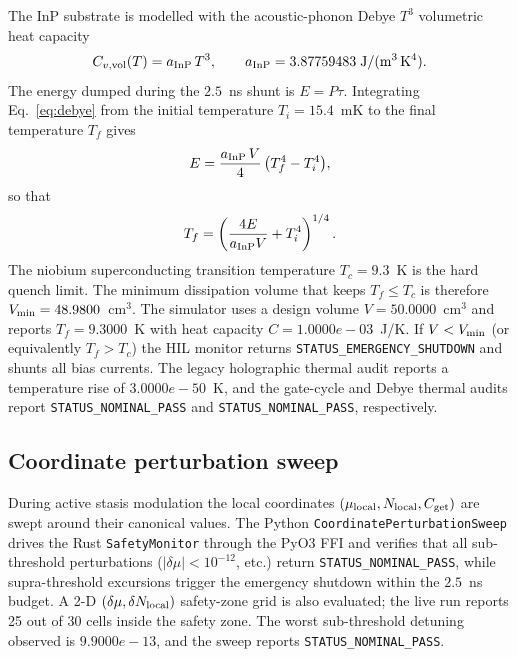 \documentclass[aps,pra,10pt,onecolumn,superscriptaddress,nofootinbib,longbibliography,floatfix]{revtex4-2}
\newcommand{\ExoticShuntStatus}{\texttt{STATUS\_NOMINAL\_PASS}}%
\newcommand{\ExoticThermalStatus}{\texttt{STATUS\_NOMINAL\_PASS}}%
\newcommand{\ExoticTemperatureRiseK}{3.0000e-50}%
\newcommand{\ExoticDebyeFinalTempK}{9.3000}%
\newcommand{\ExoticDissipationVolume}{50.0000}%
\newcommand{\ExoticMinDissipationVolume}{48.9800}%
\newcommand{\ExoticDebyeHeatCapacityJK}{1.0000e-03}%
\newcommand{\ExoticRigiditySweepStatus}{\texttt{STATUS\_NOMINAL\_PASS}}%
\newcommand{\ExoticWorstDetuning}{9.9000e-13}%
\newcommand{\ExoticSafetyZoneTotal}{30}%
\newcommand{\ExoticSafetyZoneNominal}{25}%
\begin{document}
The InP substrate is modelled with the acoustic-phonon Debye $T^3$ volumetric heat capacity
%
\begin{equation}
C_{v,\mathrm{vol}}(T) = a_{\rm InP} \, T^3,
\qquad
a_{\rm InP} = 3.87759483 \;\mathrm{J}/(\mathrm{m}^3 \, \mathrm{K}^4).
\label{eq:debye}
\end{equation}
%
The energy dumped during the $2.5$~ns shunt is $E = P \tau$.  Integrating Eq.~\eqref{eq:debye} from the initial temperature $T_i = 15.4$~mK to the final temperature $T_f$ gives
%
\begin{equation}
E = \frac{a_{\rm InP} \, V}{4} \, \bigl(T_f^4 - T_i^4\bigr),
\label{eq:debye_integral}
\end{equation}
%
so that
%
\begin{equation}
T_f = \left( \frac{4 E}{a_{\rm InP} V} + T_i^4 \right)^{1/4}.
\label{eq:tfinal}
\end{equation}
%
The niobium superconducting transition temperature $T_c = 9.3$~K is the hard quench limit.  The minimum dissipation volume that keeps $T_f \le T_c$ is therefore $V_{\rm min} = \ExoticMinDissipationVolume{}$~cm$^3$.  The simulator uses a design volume $V = \ExoticDissipationVolume{}$~cm$^3$ and reports $T_f = \ExoticDebyeFinalTempK{}$~K with heat capacity $C = \ExoticDebyeHeatCapacityJK{}$~J/K.  If $V < V_{\rm min}$ (or equivalently $T_f > T_c$) the HIL monitor returns \texttt{STATUS\_EMERGENCY\_SHUTDOWN} and shunts all bias currents.  The legacy holographic thermal audit reports a temperature rise of $\ExoticTemperatureRiseK{}$~K, and the gate-cycle and Debye thermal audits report \ExoticShuntStatus{} and \ExoticThermalStatus{}, respectively.

\subsection{Coordinate perturbation sweep}

During active stasis modulation the local coordinates $(\mu_{\rm local}, N_{\rm local}, C_{\rm get})$ are swept around their canonical values.  The Python \texttt{CoordinatePerturbationSweep} drives the Rust \texttt{SafetyMonitor} through the PyO3 FFI and verifies that all sub-threshold perturbations ($|\delta\mu| < 10^{-12}$, etc.) return \texttt{STATUS\_NOMINAL\_PASS}, while supra-threshold excursions trigger the emergency shutdown within the $2.5$~ns budget.  A 2-D $(\delta\mu,\delta N_{\rm local})$ safety-zone grid is also evaluated; the live run reports \ExoticSafetyZoneNominal{} out of \ExoticSafetyZoneTotal{} cells inside the safety zone.  The worst sub-threshold detuning observed is $\ExoticWorstDetuning{}$, and the sweep reports \ExoticRigiditySweepStatus{}.
\end{document}

